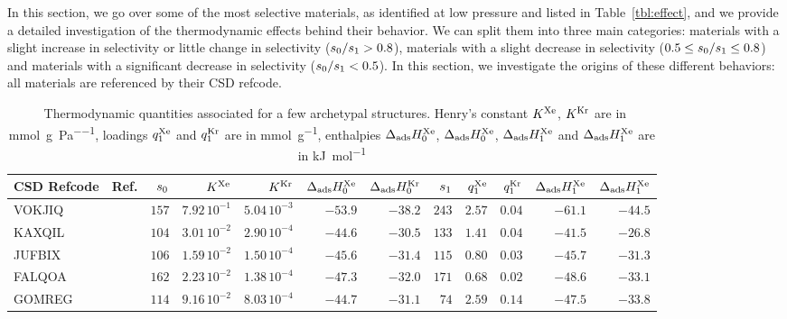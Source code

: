 \documentclass[main.tex]{subfiles}
\begin{document}
In this section, we go over some of the most selective materials, as identified at low pressure and listed in Table~\ref{tbl:effect}, and we provide a detailed investigation of the thermodynamic effects behind their behavior. We can split them into three main categories: materials with a slight increase in selectivity or little change in selectivity ($s_{\text{0}}/s_{\text{1}} > 0.8$), materials with a slight decrease in selectivity ($0.5 \le s_{\text{0}}/s_{\text{1}} \le 0.8$) and materials with a significant decrease in selectivity ($s_{\text{0}}/s_{\text{1}} < 0.5$). In this section, we investigate the origins of these different behaviors: all materials are referenced by their CSD refcode.

  
\begin{table}[hb]
\fontsize{8.5}{10.5}\selectfont
  \caption{\ Thermodynamic quantities associated for a few archetypal structures. Henry's constant $K^{\text{Xe}}$, $K^{\text{Kr}}$ are in \si{\milli\mol\per\gram\per\pascal}, loadings $q^{\text{Xe}}_{\text{1}}$ and $q^{\text{Kr}}_{\text{1}}$ are in \si{\milli\mol\per\gram}, enthalpies $\Delta_{\text{ads}}H^{\text{Xe}}_{\text{0}}$, $\Delta_{\text{ads}}H^{\text{Xe}}_{\text{0}}$, $\Delta_{\text{ads}}H^{\text{Xe}}_{\text{1}}$ and $\Delta_{\text{ads}}H^{\text{Xe}}_{\text{1}}$ are in \si{\kilo\joule\per\mol} }\label{tbl:thermo}
  \label{tbl:example}
    \renewcommand{\arraystretch}{1.5}
    \begin{tabular}{|lr|rrrrr|rrrrr|}
    \hline
          CSD Refcode & Ref. &  $s_{\text{0}}$ &  $K^{\text{Xe}}$ &  $K^{\text{Kr}}$ &  $\Delta_{\text{ads}}H^{\text{Xe}}_{\text{0}}$ &  $\Delta_{\text{ads}}H^{\text{Kr}}_{\text{0}}$  &  $s_{\text{1}}$ &  $q^{\text{Xe}}_{\text{1}}$ &  $q^{\text{Kr}}_{\text{1}}$ &  $\Delta_{\text{ads}}H^{\text{Xe}}_{\text{1}}$ &  $\Delta_{\text{ads}}H^{\text{Xe}}_{\text{1}}$ \\
    \hline
        VOKJIQ & \cite{VOKJIQ}        &  $157$  &  $7.92\,10^{-1}$  &  $5.04\,10^{-3}$  &  $-53.9$  &  $-38.2$  &  $243$  &  $2.57$  &  $0.04$  &  $-61.1$  &  $-44.5$  \\
        KAXQIL & \cite{KAXQIL}        &  $104$  &  $3.01\,10^{-2}$  &  $2.90\,10^{-4}$  &  $-44.6$  &  $-30.5$  &  $133$  &  $1.41$  &  $0.04$  &  $-41.5$  &  $-26.8$  \\
        JUFBIX & \cite{JUFBIX}        &  $106$  &  $1.59\,10^{-2}$  &  $1.50\,10^{-4}$  &  $-45.6$  &  $-31.4$  &  $115$  &  $0.80$  &  $0.03$  &  $-45.7$  &  $-31.3$  \\
        FALQOA & \cite{FALQOA}        &  $162$  &  $2.23\,10^{-2}$  &  $1.38\,10^{-4}$  &  $-47.3$  &  $-32.0$  &  $171$  &  $0.68$  &  $0.02$  &  $-48.6$  &  $-33.1$  \\
        GOMREG & \cite{GOMREG_GOMRAC} &  $114$  &  $9.16\,10^{-2}$  &  $8.03\,10^{-4}$  &  $-44.7$  &  $-31.1$  &  $ 74$  &  $2.59$  &  $0.14$  &  $-47.5$  &  $-33.8$  \\

\end{tabular}
\end{table}
\end{document}
